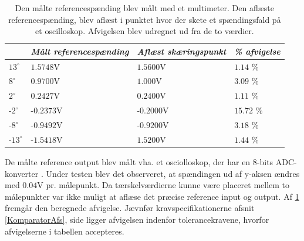 \begin{table}[H]
\centering
\begin{tabular}{|l|l|l|l|}
\hline
           & \textit{Målt referencespænding} & \textit{Aflæst skæringspunkt} & \textit{\% afvigelse} \\ \hline
$13^\circ$  & $1.5748$V                      & $1.5600$V                      & $1.14$ \%              \\ \hline
$8^\circ$   & $0.9700$V                      & $1.000$V                       & $3.09$ \%              \\ \hline
$2^\circ$   & $0.2427$V                      & $0.2400$V                      & $1.11$ \%                                    \\ \hline
-$2^\circ$  & -$0.2373$V                     & -$0.2000$V                     & $15.72$ \%                                \\ \hline
-$8^\circ$  & -$0.9492$V                     & -$0.9200$V                     & $3.18$ \%              \\ \hline
-$13^\circ$ & -$1.5418$V                     & $1.5200$V                      & $1.44$ \%              \\ \hline
\end{tabular}
\caption{Den målte referencespænding blev målt med et multimeter. Den aflæste referencespænding, blev aflæst i punktet hvor der skete et spændingsfald på et oscilloskop. Afvigelsen blev udregnet ud fra de to værdier.}
\label{Tab:test-taendsluk}
\end{table}

\noindent De målte reference output blev målt vha. et osciolloskop, der har en 8-bits ADC-konverter \cite{RIGOL2010}. Under testen blev det observeret, at spændingen ud af y-aksen  ændres med $0.04$V pr. målepunkt. Da tærskelværdierne kunne være placeret mellem to målepunkter var ikke muligt at aflæse det præcise reference input og output. Af \ref{Tab:test-taendsluk} fremgår den beregnede afvigelse. Jævnfør kravspecifikationerne afsnit \ref{KomparatorAfs}, side \pageref{KomparatorAfs} ligger afvigelsen indenfor tolerancekravene, hvorfor afvigelserne i tabellen accepteres. 